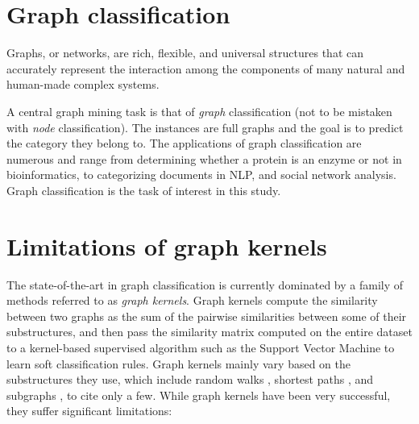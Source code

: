 \documentclass[sigconf]{acmart}
\begin{document}
\section{Graph classification}
Graphs, or networks, are rich, flexible, and universal structures that can accurately represent the interaction among the components of many natural and human-made complex systems.

A central graph mining task is that of \textit{graph} classification (not to be mistaken with \textit{node} classification). The instances are full graphs and the goal is to predict the category they belong to. The applications of graph classification are numerous and range from determining whether a protein is an enzyme or not in bioinformatics, to categorizing documents in NLP, and social network analysis. Graph classification is the task of interest in this study.

\section{Limitations of graph kernels}
The state-of-the-art in graph classification is currently dominated by a family of methods referred to as \textit{graph kernels}. Graph kernels compute the similarity between two graphs as the sum of the pairwise similarities between some of their substructures, and then pass the similarity matrix computed on the entire dataset to a kernel-based supervised algorithm such as the Support Vector Machine \citep{cortes1995support} to learn soft classification rules. Graph kernels mainly vary based on the substructures they use, which include random walks \citep{gartner2003graph}, shortest paths \citep{borgwardt2005shortest}, and subgraphs \citep{shervashidze2009efficient}, to cite only a few. While graph kernels have been very successful, they suffer significant limitations:
\end{document}
